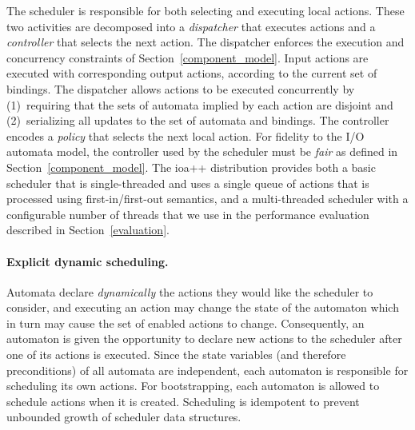 The scheduler is responsible for both selecting and executing local actions.
These two activities are decomposed into a \emph{dispatcher} that executes actions and a \emph{controller} that selects the next action.
The dispatcher enforces the execution and concurrency constraints of Section~\ref{component_model}.
Input actions are executed with corresponding output actions, according to the current set of bindings.
The dispatcher allows actions to be executed concurrently by (1)~requiring that the sets of automata implied by each action are disjoint and (2)~serializing all updates to the set of automata and bindings.
The controller encodes a \emph{policy} that selects the next local action.
For fidelity to the I/O automata model, the controller used by the scheduler must be \emph{fair} as defined in Section~\ref{component_model}.
The ioa++ distribution provides both a basic scheduler that is single-threaded and uses a single queue of actions that is processed using first-in/first-out semantics, and a multi-threaded scheduler with a configurable number of threads that we use in the performance evaluation described in Section~\ref{evaluation}.

\paragraph*{Explicit dynamic scheduling.}
Automata declare \emph{dynamically} the actions they would like the scheduler to consider, and executing an action may change the state of the automaton which in turn may cause the set of enabled actions to change.
Consequently, an automaton is given the opportunity to declare new actions to the scheduler after one of its actions is executed.
Since the state variables (and therefore preconditions) of all automata are independent, each automaton is responsible for scheduling its own actions.
For bootstrapping, each automaton is allowed to schedule actions when it is created.
Scheduling is idempotent to prevent unbounded growth of scheduler data structures.

